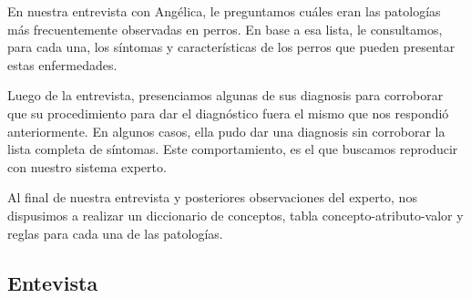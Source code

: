 \documentclass[a4paper,table,xcdraw]{article}
\begin{document}
En nuestra entrevista con Angélica, le preguntamos cuáles eran las patologías más frecuentemente observadas en perros. En base a esa lista, le consultamos, para cada una, los síntomas y características de los perros que pueden presentar estas enfermedades.

Luego de la entrevista, presenciamos algunas de sus diagnosis para corroborar que su procedimiento para dar el diagnóstico fuera el mismo que nos respondió anteriormente. En algunos casos, ella pudo dar una diagnosis sin corroborar la lista completa de síntomas. Este comportamiento, es el que buscamos reproducir con nuestro sistema experto.

Al final de nuestra entrevista y posteriores observaciones del experto, nos dispusimos a realizar un diccionario de conceptos, tabla concepto-atributo-valor y reglas para cada una de las patologías.

\subsection{Entevista}

\end{document}
